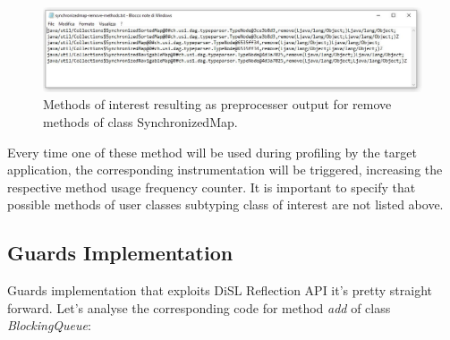 \documentclass[]{usiinfthesis}
\begin{document}
\vspace{0.5cm}
\begin{figure}[h]
    \centering
    \includegraphics[scale=0.45]{Immagini/outputmethods.JPG} 
    \caption[Preprosserer Output]{Methods of interest resulting as preprocesser output for remove methods of class SynchronizedMap.}
    \label{fig:4}
\end{figure}
\vspace{0.5cm}


\newline
\noindent
Every time one of these method will be used during profiling by the target application, the corresponding instrumentation will be triggered, increasing the respective method usage frequency counter. It is important to specify that possible methods of user classes subtyping class of interest are not listed above.

\subsection{Guards Implementation}
Guards implementation that exploits DiSL Reflection API it's pretty straight forward. Let's analyse the corresponding code for method \textit{add} of class \textit{BlockingQueue}:
\end{document}
